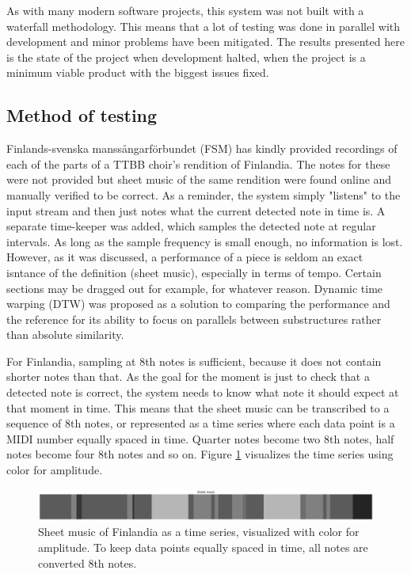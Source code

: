 As with many modern software projects, this system was not built with a waterfall methodology. This means that a lot of testing was done in parallel with development and minor problems have been mitigated. The results presented here is the state of the project when development halted, when the project is a minimum viable product with the biggest issues fixed.

\subsection{Method of testing}
Finlands-svenska manssångarförbundet (FSM) has kindly provided recordings of each of the parts of a TTBB choir's rendition of Finlandia. The notes for these were not provided but sheet music of the same rendition were found online and manually verified to be correct. As a reminder, the system simply "listens" to the input stream and then just notes what the current detected note in time is. A separate time-keeper was added, which samples the detected note at regular intervals. As long as the sample frequency is small enough, no information is lost. However, as it was discussed, a performance of a piece is seldom an exact isntance of the definition (sheet music), especially in terms of tempo. Certain sections may be dragged out for example, for whatever reason. Dynamic time warping (DTW) was proposed as a solution to comparing the performance and the reference for its ability to focus on parallels between substructures rather than absolute similarity.

For Finlandia, sampling at 8th notes is sufficient, because it does not contain shorter notes than that. As the goal for the moment is just to check that a detected note is correct, the system needs to know what note it should expect at that moment in time. This means that the sheet music can be transcribed to a sequence of 8th notes, or represented as a time series where each data point is a MIDI number equally spaced in time. Quarter notes become two 8th notes, half notes become four 8th notes and so on. Figure \ref{fig:sheetEncoding} visualizes the time series using color for amplitude.

\begin{figure}[ht]
    \centering
    \includegraphics[width=\textwidth]{./images/sheetEncoding.png}
    \caption{Sheet music of Finlandia as a time series, visualized with color for amplitude. To keep data points equally spaced in time, all notes are converted 8th notes. \label{fig:sheetEncoding}}
\end{figure}

